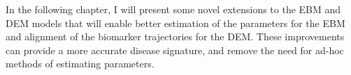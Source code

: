In the following chapter, I will present some novel extensions to the EBM and DEM models that will enable better estimation of the parameters for the EBM and alignment of the biomarker trajectories for the DEM. These improvements can provide a more accurate disease signature, and remove the need for ad-hoc methods of estimating parameters.





























